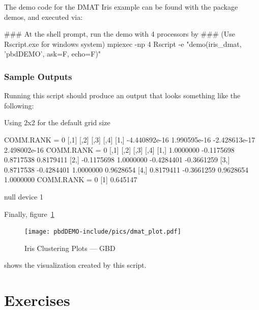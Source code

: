 The demo code for the DMAT Iris example can be found with the package demos,
and executed via:
\begin{Command}
### At the shell prompt, run the demo with 4 processors by
### (Use Rscript.exe for windows system)
mpiexec -np 4 Rscript -e "demo(iris_dmat, 'pbdDEMO', ask=F, echo=F)"
\end{Command}


\subsubsection{Sample Outputs}
Running this script should produce an output that looks something like the
following:
\begin{Output}
Using 2x2 for the default grid size

COMM.RANK = 0
              [,1]         [,2]          [,3]         [,4]
[1,] -4.440892e-16 1.990595e-16 -2.428613e-17 2.498002e-16
COMM.RANK = 0
           [,1]       [,2]       [,3]       [,4]
[1,]  1.0000000 -0.1175698  0.8717538  0.8179411
[2,] -0.1175698  1.0000000 -0.4284401 -0.3661259
[3,]  0.8717538 -0.4284401  1.0000000  0.9628654
[4,]  0.8179411 -0.3661259  0.9628654  1.0000000
COMM.RANK = 0
[1] 0.645147

null device 
          1 
\end{Output}

Finally, figure~\ref{fig:iris_cluster_gbd}
\begin{figure}[h!bt]
  \centering
  \texttt{[image: pbdDEMO-include/pics/dmat\_plot.pdf]}
  \caption{Iris Clustering Plots --- GBD}
  \label{fig:iris_cluster_gbd}
\end{figure}
shows the visualization created by this script.




\section{Exercises}
\label{sec:pmclust_exercise}

